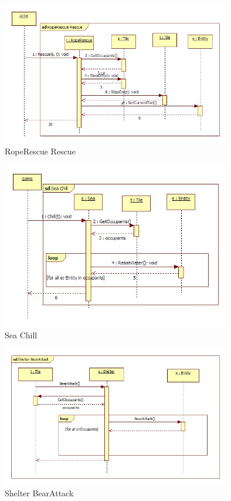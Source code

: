 \begin{figure}[H]
        \begin{center}
                \includegraphics[width=10cm]{chapters/chapter07/seqdiag/RopeRescue_Rescue.jpg}
                \caption{RopeRescue Rescue}
                \label{RopeRescue Rescue}
        \end{center}
\end{figure}
\begin{figure}[H]
        \begin{center}
                \includegraphics[width=10cm]{chapters/chapter07/seqdiag/Sea_Chill.jpg}
                \caption{Sea Chill}
                \label{SeaChill}
        \end{center}
\end{figure}
\begin{figure}[H]
        \begin{center}
                \includegraphics[width=10cm]{chapters/chapter07/seqdiag/Shelter_BearAttack.jpg}
                \caption{Shelter BearAttack}
                \label{Shelter BearAttack}
        \end{center}
\end{figure}
